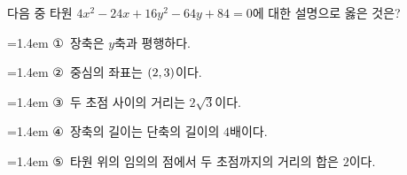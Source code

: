 다음 중 타원 $4x^2-24x+16y^2-64y+84=0$에 대한 설명으로 옳은 것은?
\par\medskip\par\noindent\hangindent=1.4em {\small ①}\ 장축은 $y$축과 평행하다.\par\noindent\hangindent=1.4em {\small ②}\ 중심의 좌표는 $(2{,}\mkern3mu\mathopen{}3)$이다.\par\noindent\hangindent=1.4em {\small ③}\ 두 초점 사이의 거리는 $2\sqrt{3}$이다.\par\noindent\hangindent=1.4em {\small ④}\ 장축의 길이는 단축의 길이의 $4$배이다.\par\noindent\hangindent=1.4em {\small ⑤}\ 타원 위의 임의의 점에서 두 초점까지의 거리의 합은 $2$이다.\par\medskip
